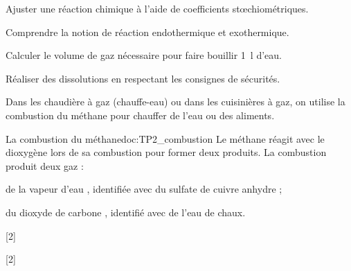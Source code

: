 \teteSndChim

\correction{\vspace*{-24pt}}

\begin{objectifs}
  \item Ajuster une réaction chimique à l'aide de coefficients stœchiométriques.
  \item Comprendre la notion de réaction endothermique et exothermique. 
  \item Calculer le volume de gaz nécessaire pour faire bouillir \qty{1}{\litre} d'eau.
  \item Réaliser des dissolutions en respectant les consignes de sécurités.
\end{objectifs}

\begin{contexte}
  Dans les chaudière à gaz (chauffe-eau) ou dans les cuisinières à gaz, on utilise la combustion du méthane pour chauffer de l'eau ou des aliments.
  
\end{contexte}


\begin{doc}{La combustion du méthane}{doc:TP2_combustion}
  Le méthane \methane réagit avec le dioxygène \dioxygene lors de sa combustion pour former deux produits.
  La combustion produit deux gaz :
  \begin{listePoints}
    \item de la vapeur d'eau \eau, identifiée avec du sulfate de cuivre anhydre ;
    \item du dioxyde de carbone \dioxydeDeCarbone, identifié avec de l'eau de chaux.
  \end{listePoints}
\end{doc}


[2]

[2]

